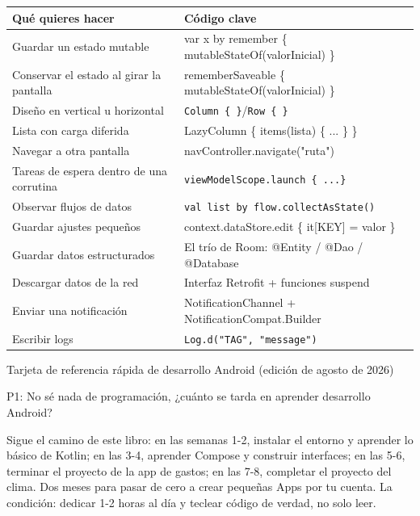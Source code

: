 


\begin{center}
\begin{tabularx}{\linewidth}{|X|X|}
\hline
\textbf{Qué quieres hacer} & \textbf{Código clave} \tabularnewline
\hline
Guardar un estado mutable & var x by remember \{ mutableStateOf(valorInicial) \} \tabularnewline
Conservar el estado al girar la pantalla & rememberSaveable \{ mutableStateOf(valorInicial) \} \tabularnewline
Diseño en vertical u horizontal & \texttt{Column \{ \}}/\texttt{Row \{ \}} \tabularnewline
Lista con carga diferida & LazyColumn \{ items(lista) \{ ... \} \} \tabularnewline
Navegar a otra pantalla & navController.navigate("ruta") \tabularnewline
Tareas de espera dentro de una corrutina & \texttt{viewModelScope.\allowbreak launch \{ .\allowbreak .\allowbreak .\allowbreak  \}} \tabularnewline
Observar flujos de datos & \texttt{val list by flow.\allowbreak collectAsState()} \tabularnewline
Guardar ajustes pequeños & context.dataStore.edit \{ it[KEY] = valor \} \tabularnewline
Guardar datos estructurados & El trío de Room: @Entity / @Dao / @Database \tabularnewline
Descargar datos de la red & Interfaz Retrofit + funciones suspend \tabularnewline
Enviar una notificación & NotificationChannel + NotificationCompat.Builder \tabularnewline
Escribir logs & \texttt{Log.\allowbreak d("TAG", "message")} \tabularnewline
\hline
\end{tabularx}
\end{center}

\begin{center}\small\color{gray}Tarjeta de referencia rápida de desarrollo Android (edición de agosto de 2026)\end{center}


P1: No sé nada de programación, ¿cuánto se tarda en aprender desarrollo Android?

Sigue el camino de este libro: en las semanas 1-2, instalar el entorno y aprender lo básico de Kotlin; en las 3-4, aprender Compose y construir interfaces; en las 5-6, terminar el proyecto de la app de gastos; en las 7-8, completar el proyecto del clima. Dos meses para pasar de cero a crear pequeñas Apps por tu cuenta. La condición: dedicar 1-2 horas al día y teclear código de verdad, no solo leer.

